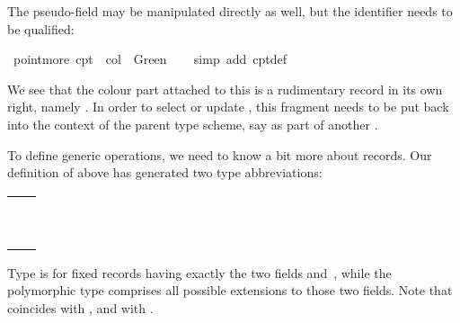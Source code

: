 \begin{isabellebody}
\begin{isamarkuptext}
  The  pseudo-field may be manipulated directly as well,
  but the identifier needs to be qualified:%
\end{isamarkuptext}%
\isamarkuptrue%
\ {\isachardoublequote}point{\isachardot}more\ cpt{}\ {\isacharequal}\ {\isasymlparr}col\ {\isacharequal}\ Green{\isasymrparr}{\isachardoublequote}\isanewline
\ \ \isamarkupfalse%
\ {\isacharparenleft}simp\ add{\isacharcolon}\ cpt{}{\isacharunderscore}def{\isacharparenright}\isamarkupfalse%
%
\begin{isamarkuptext}%
We see that the colour part attached to this  is a
  rudimentary record in its own right, namely .  In order to select or update , this fragment
  needs to be put back into the context of the parent type scheme, say
  as  part of another .

  To define generic operations, we need to know a bit more about
  records.  Our definition of  above has generated two
  type abbreviations:

  \medskip
  \begin{tabular}{l}
  \isa{point}~\isa{{\isacharequal}}~\isa{point} \\
  \isa{{\isacharprime}a\ point{\isacharunderscore}scheme}~\isa{{\isacharequal}}~\isa{{\isacharprime}a\ point{\isacharunderscore}scheme} \\
  \end{tabular}
  \medskip

  Type  is for fixed records having exactly the two fields
   and~, while the polymorphic type  comprises all possible extensions to those two
  fields.  Note that  coincides with , and  with .


\end{isamarkuptext}
\end{isabellebody}
